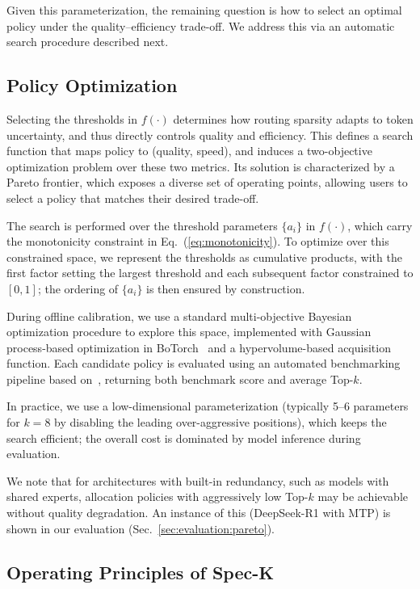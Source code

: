 \documentclass[conference]{IEEEtran}
\theoremstyle{definition} %
\begin{document}
Given this parameterization, the remaining question is how to select an optimal policy under the quality–efficiency trade-off.
We address this via an automatic search procedure described next.

\subsection{Policy Optimization} \label{sec:method:autosearch}

Selecting the thresholds in $f(\cdot)$ determines how routing sparsity adapts to token uncertainty, and thus directly controls quality and efficiency.
This defines a search function that maps policy to (quality, speed), and induces a two-objective optimization problem over these two metrics.
Its solution is characterized by a Pareto frontier, which exposes a diverse set of operating points, allowing users to select a policy that matches their desired trade-off.

The search is performed over the threshold parameters $\{a_i\}$ in $f(\cdot)$, which carry the monotonicity constraint in Eq.~(\ref{eq:monotonicity}).
To optimize over this constrained space, we represent the thresholds as cumulative products, with the first factor setting the largest threshold and each subsequent factor constrained to $[0,1]$; the ordering of $\{a_i\}$ is then ensured by construction.

During offline calibration, we use a standard multi-objective Bayesian optimization procedure to explore this space, implemented with Gaussian process-based optimization in BoTorch~\cite{balandat2020botorch} and a hypervolume-based acquisition function.
Each candidate policy is evaluated using an automated benchmarking pipeline based on~\cite{gao2024evalharness}, returning both benchmark score and average Top-$k$.

In practice, we use a low-dimensional parameterization (typically 5--6 parameters for $k=8$ by disabling the leading over-aggressive positions), which keeps the search efficient; the overall cost is dominated by model inference during evaluation.

We note that for architectures with built-in redundancy, such as models with shared 
experts, allocation policies with aggressively low Top-$k$ may be achievable without 
quality degradation. An instance of this (DeepSeek-R1 with MTP) is shown in our evaluation
(Sec.~\ref{sec:evaluation:pareto}).

\subsection{Operating Principles of Spec-K}
\label{sec:mechanism}
\end{document}
